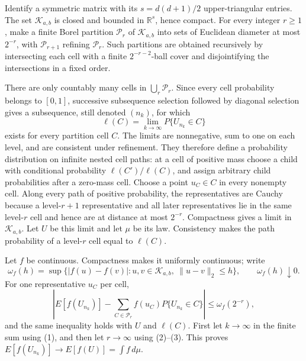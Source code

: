 Identify a symmetric matrix with its \(s=d(d+1)/2\) upper-triangular entries. The set \(\mathcal K_{a,b}\) is closed and bounded in \(\mathbb R^s\), hence compact. For every integer \(r\ge1\), make a finite Borel partition \(\mathcal P_r\) of \(\mathcal K_{a,b}\) into sets of Euclidean diameter at most \(2^{-r}\), with \(\mathcal P_{r+1}\) refining \(\mathcal P_r\). Such partitions are obtained recursively by intersecting each cell with a finite \(2^{-r-2}\)-ball cover and disjointifying the intersections in a fixed order.

There are only countably many cells in \(\bigcup_r\mathcal P_r\). Since every cell probability belongs to \([0,1]\), successive subsequence selection followed by diagonal selection gives a subsequence, still denoted \((n_k)\), for which
\[
 \ell(C)=\lim_{k\to\infty}P\{U_{n_k}\in C\} \tag{1}
\]
exists for every partition cell \(C\). The limits are nonnegative, sum to one on each level, and are consistent under refinement. They therefore define a probability distribution on infinite nested cell paths: at a cell of positive mass choose a child with conditional probability \(\ell(C')/\ell(C)\), and assign arbitrary child probabilities after a zero-mass cell. Choose a point \(u_C\in C\) in every nonempty cell. Along every path of positive probability, the representatives are Cauchy because a level-\(r+1\) representative and all later representatives lie in the same level-\(r\) cell and hence are at distance at most \(2^{-r}\). Compactness gives a limit in \(\mathcal K_{a,b}\). Let \(U\) be this limit and let \(\mu\) be its law. Consistency makes the path probability of a level-\(r\) cell equal to \(\ell(C)\).

Let \(f\) be continuous. Compactness makes it uniformly continuous; write
\[
 \omega_f(h)=\sup\{|f(u)-f(v)|:u,v\in\mathcal K_{a,b},\ \|u-v\|_2\le h\},
 \qquad \omega_f(h)\downarrow0. \tag{2}
\]
For one representative \(u_C\) per cell,
\[
 \left|E[f(U_{n_k})]-\sum_{C\in\mathcal P_r}f(u_C)P\{U_{n_k}\in C\}\right|
 \le\omega_f(2^{-r}), \tag{3}
\]
and the same inequality holds with \(U\) and \(\ell(C)\). First let \(k\to\infty\) in the finite sum using (1), and then let \(r\to\infty\) using (2)--(3). This proves \(E[f(U_{n_k})]\to E[f(U)]=\int f\,d\mu\).